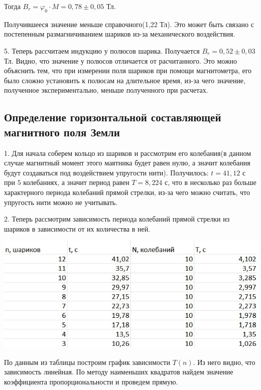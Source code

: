 \documentclass[a4paper,12pt]{article}
\begin{document}
Тогда $B_r = \varphi_0 \cdot M = 0,78 \pm 0,05$ Тл.

Получившееся значение меньше справочного(1,22 Тл). Это может быть связано с постепенным размагничиванием шариков из-за механического воздействия.

5. Теперь рассчитаем индукцию у полюсов шарика. Получается $B_r = 0,52 \pm 0,03$ Тл. Видно, что значение у полюсов отличается от расчитанного. Это можно объяснить тем, что при измерении поля шариков при помощи магнитометра, его было сложно установить к полюсам на длительное время, из-за чего значение, полученное экспериментально, меньше полученного при расчетах.

\subsection*{Определение горизонтальной составляющей магнитного поля Земли}
1. Для начала соберем кольцо из шариков и рассмотрим его колебания(в данном случае магнитный момент этого маятника будет равен нулю, а значит колебания будут создаваться под воздействием упругости нити). Получилось: $t = 41,12$ с при $5$ колебаниях, а значит период равен $T = 8,224$ с, что в несколько раз больше характерного периода колебаний прямой стрелки, из-за чего можно считать, что упругость нити можно не учитывать.

2. Теперь рассмотрим зависимость периода колебаний прямой стрелки из шариков в зависимости от их количества в ней.

\begin{center}
  \includegraphics[scale=1.2]{tabliza.jpg}
  \label{fig:picture}
\end{center}

\newpage
По данным из таблицы построим график зависимости $T(n)$. Из него видно, что зависимость линейная. По методу наименьших квадратов найдем значение коэффициента пропорциональности и проведем прямую.
\end{document}
